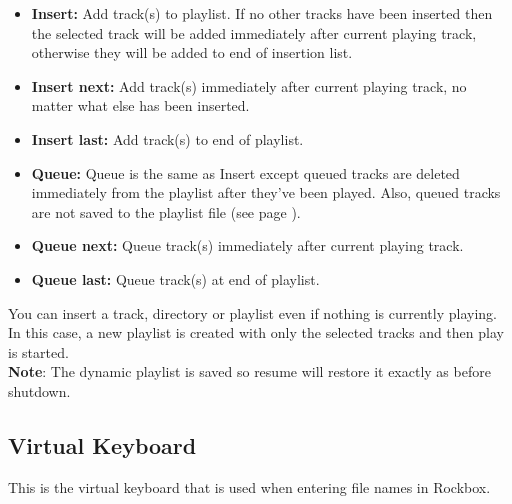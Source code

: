 \begin{itemize}
\item \textbf{Insert:} Add track(s) to playlist. If no other tracks have been inserted then the selected track will be added immediately after current playing track, otherwise they will be added to end of insertion list.
\item \textbf{Insert next: }Add track(s) immediately after current playing track, no matter what else has been inserted.
\item \textbf{Insert last: }Add track(s) to end of playlist.
\item \textbf{Queue: } Queue is the same as Insert except queued tracks are deleted immediately from the playlist after they've been played. Also, queued tracks are not saved to the playlist file (see page \pageref{ref:playlistoptions}).
\item \textbf{Queue next:} Queue track(s) immediately after current playing track.
\item \textbf{Queue last: }Queue track(s) at end of playlist.
\end{itemize}

You can insert a track, directory or playlist even if nothing is currently playing. In this case, a new playlist is created with only the selected tracks and then play is started.\\
\textbf{Note}: The dynamic playlist is saved so resume will restore it exactly as before shutdown.

\subsection{Virtual Keyboard}
This is the virtual keyboard that is used when entering file names in Rockbox.

